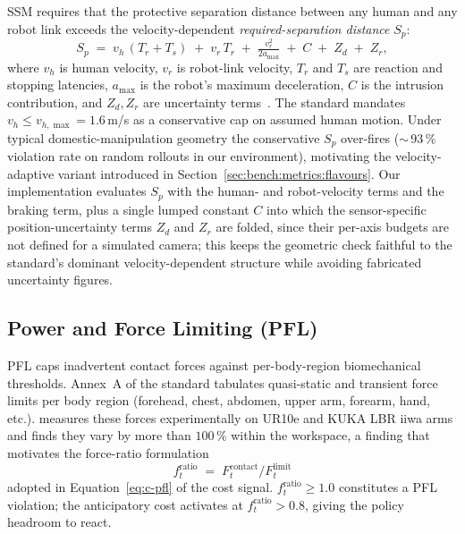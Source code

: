 \documentclass[11pt,a4paper]{report}
\newcommand{\ssm}{SSM}
\newcommand{\pfl}{PFL}
\begin{document}
\ssm{} requires that the protective separation distance between any
human and any robot link exceeds the velocity-dependent
\emph{required-separation distance} $S_p$:
\begin{equation}
  S_p \;=\; v_h \,(T_r + T_s) \;+\; v_r \, T_r
     \;+\; \tfrac{v_r^2}{2 a_{\max}} \;+\; C \;+\; Z_d \;+\; Z_r,
  \label{eq:iso-ssm}
\end{equation}
where $v_h$ is human velocity, $v_r$ is robot-link velocity, $T_r$
and $T_s$ are reaction and stopping latencies, $a_{\max}$ is the
robot's maximum deceleration, $C$ is the intrusion contribution,
and $Z_d, Z_r$ are uncertainty terms~\cite{iso15066,svarny2019unified}.
The standard mandates $v_h \le v_{h,\max} = 1.6$\,m/s as a
conservative cap on assumed human motion. Under typical
domestic-manipulation geometry the conservative $S_p$ over-fires
($\sim$\,93\,\% violation rate on random rollouts in our
environment), motivating the velocity-adaptive variant introduced in
Section~\ref{sec:bench:metrics:flavours}. Our implementation
evaluates $S_p$ with the human- and robot-velocity terms and the
braking term, plus a single lumped constant $C$ into which the
sensor-specific position-uncertainty terms $Z_d$ and $Z_r$ are
folded, since their per-axis budgets are not defined for a simulated
camera; this keeps the geometric check faithful to the standard's
dominant velocity-dependent structure while avoiding fabricated
uncertainty figures.

\subsection{Power and Force Limiting (\pfl{})}
\label{sec:bg:iso:pfl}

\pfl{} caps inadvertent contact forces against per-body-region
biomechanical thresholds. Annex~A of the standard tabulates
quasi-static and transient force limits per body region
(forehead, chest, abdomen, upper arm, forearm, hand, etc.).
\cite{svarny2020collision} measures these forces experimentally on
UR10e and KUKA LBR iiwa arms and finds they vary by more than
$100\,\%$ within the workspace, a finding that motivates the
force-ratio formulation
\begin{equation}
  f^{\mathrm{ratio}}_t \;=\; F^{\mathrm{contact}}_t /
                              F^{\mathrm{limit}}_t
  \label{eq:iso-pfl-ratio}
\end{equation}
adopted in Equation~\ref{eq:c-pfl} of the cost signal.
$f^{\mathrm{ratio}}_t \ge 1.0$ constitutes a \pfl{} violation; the
anticipatory cost activates at $f^{\mathrm{ratio}}_t > 0.8$, giving
the policy headroom to react.
\end{document}
